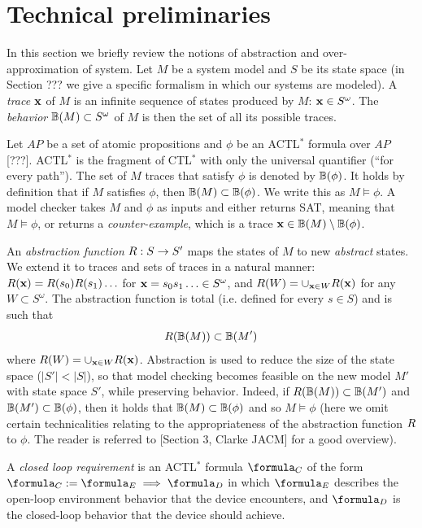 \section{Technical preliminaries}
\label{preliminaries}
In this section we briefly review the notions of abstraction and over-approximation of system.
Let $M$ be a system model and $S$ be its state space (in Section ??? we give a specific formalism in which our systems are modeled).
A \emph{trace} $\mathbf{x}$ of $M$ is an infinite sequence of states produced by $M$: $\mathbf{x} \in S^\omega$.
The \emph{behavior} $\mathbb{B}(M) \subset S^\omega$ of $M$ is then the set of all its possible traces.

Let $AP$ be a set of atomic propositions and $\phi$ be an ACTL$^*$ formula over $AP$ [???].
ACTL$^*$ is the fragment of CTL$^*$ with only the universal quantifier (``for every path'').
The set of $M$ traces that satisfy $\phi$ is denoted by $\mathbb{B}(\phi)$. 
It holds by definition that if $M$ satisfies $\phi$, then $\mathbb{B}(M) \subset \mathbb{B}(\phi)$.
We write this as $M \models \phi$.
A model checker takes $M$ and $\phi$ as inputs and either returns SAT, meaning that $M \models \phi$, or returns a \emph{counter-example}, which is a trace $\mathbf{x} \in \mathbb{B}(M) \setminus \mathbb{B}(\phi)$.

An \emph{abstraction function} $R: S \rightarrow S'$ maps the states of $M$ to new \emph{abstract} states.
We extend it to traces and sets of traces in a natural manner: $R(\mathbf{x}) =  R(s_0)R(s_1)\ldots$ for $\mathbf{x} = s_0 s_1\ldots \in S^\omega$,
and $R(W) = \cup_{\mathbf{x} \in W}R(\mathbf{x})$ for any $W \subset S^\omega$.
The abstraction function is total (i.e. defined for every $s \in S$) and is such that
\[R(\mathbb{B}(M)) \subset \mathbb{B}(M') \]
where $R(W) = \cup_{\mathbf{x} \in W} R(\mathbf{x})$.
Abstraction is used to reduce the size of the state space ($|S'| < |S|$), so that model checking becomes feasible on the new model $M'$ with state space $S'$, while preserving behavior.
Indeed, if $R(\mathbb{B}(M)) \subset  \mathbb{B}(M') $ and $\mathbb{B}(M') \subset \mathbb{B}(\phi)$, then it holds that $\mathbb{B}(M) \subset \mathbb{B}(\phi)$ and so $M \models \phi$ (here we omit certain technicalities relating to the appropriateness of the abstraction function $R$ to $\phi$. The reader is referred to [Section 3, Clarke JACM] for a good overview).

A \emph{closed loop requirement} is an ACTL$^*$ formula $\formula_C$ of the form $\formula_C :=\formula_E \implies \formula_D$ in which $\formula_E$ describes the open-loop environment behavior that the device encounters, and $\formula_D$ is the closed-loop behavior that the device should achieve. 

